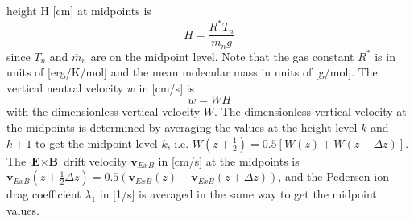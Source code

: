 height H [cm] at midpoints is
%
\begin{equation}
  H= \frac{R^* T_n}{\overline{m}_n g}
\end{equation}
%
since $T_n$ and $\overline{m}_n$ are on the midpoint level. Note
that the gas constant $R^*$ is in units of [erg/K/mol] and the mean
molecular mass in units of [g/mol]. The vertical neutral velocity
$w$ in [cm/s] is
%
\begin{equation}
  w = W H
\end{equation}
%
with the dimensionless vertical velocity $W$. The dimensionless
vertical velocity at the midpoints is determined by averaging the
values at the height level $k$ and $k+1$ to get the midpoint level
$k$, i.e. $W(z+\frac{1}{2}) = 0.5[W(z)+W(z+\Delta z)]$. The
$\textbf{E}\times \textbf{B}$ drift velocity $\textbf{v}_{ExB}$ in
[cm/s] at the midpoints is $\textbf{v}_{ExB}(z+\frac{1}{2}\Delta z)
= 0.5(\textbf{v}_{ExB}(z)+\textbf{v}_{ExB}(z+\Delta z))$, and the
Pedersen ion drag coefficient $\lambda_1$ in
[1/s] is averaged in the same way to get the midpoint values. \\

